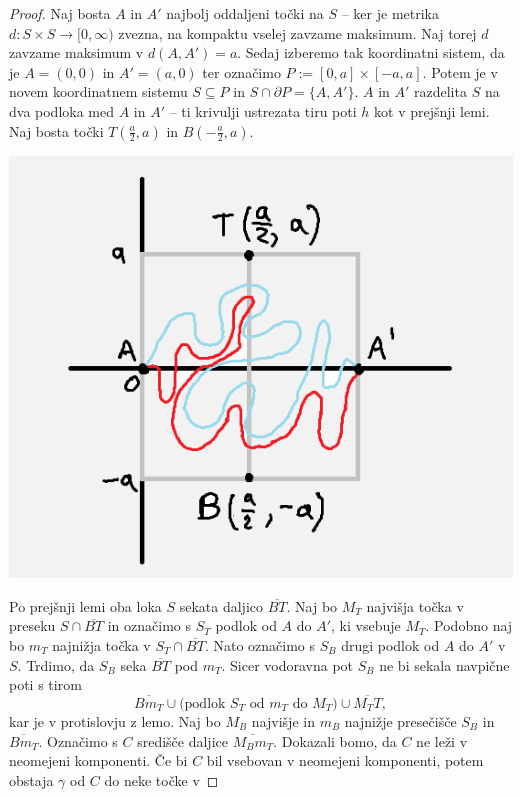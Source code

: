 \documentclass[10pt, a4paper]{article}
\newenvironment{noticeC}{%
  \tcolorbox[%
  notitle,
  empty,
  enhanced,  %
  breakable,
  coltext=black, 
  fontupper=\rmfamily,
  noparskip,
  sharp corners,
  boxrule=-1pt,  %
  frame hidden,
  left=7pt,  %
  right=7pt,
  top=5pt,
  bottom=5pt,
  before skip=2.5ex plus 2pt,
  after skip=2.5ex plus 2pt,
  overlay unbroken and last={%
  },
  ]}
{\endtcolorbox}
\newenvironment{dokaz}%
  {\begin{noticeC}\begin{proof}}%
  {\end{proof}\end{noticeC}}
\begin{document}
\begin{dokaz}
  Naj bosta $A$ in $A'$ najbolj oddaljeni točki na $S$ -- ker je metrika $d: S \times S \to [0, \infty)$
  zvezna, na kompaktu vselej zavzame maksimum. Naj torej $d$ zavzame maksimum v $d(A, A') = a$.
  Sedaj izberemo tak koordinatni sistem, da je $A = (0, 0)$ in $A' = (a, 0)$ ter označimo $P := [0, a] \times [-a, a]$.
  Potem je v novem koordinatnem sistemu $S \subseteq P$ in $S \cap \partial P = \{A, A'\}$.
  $A$ in $A'$ razdelita $S$ na dva podloka med $A$ in $A'$ -- ti krivulji ustrezata tiru poti $h$ kot v prejšnji lemi.
  Naj bosta točki $T\left(\frac{a}{2}, a\right)$ in $B\left(-\frac{a}{2}, a\right)$.
  \begin{center}
    \includegraphics[scale=0.8]{dokaz5.png}
  \end{center}
  Po prejšnji lemi oba loka $S$ sekata daljico $\overline{BT}$.
  Naj bo $M_T$ najvišja točka v preseku $S \cap \overline{BT}$ in označimo s $S_T$ podlok od $A$ do $A'$,
  ki vsebuje $M_T$. Podobno naj bo $m_T$ najnižja točka v $S_T \cap \overline{BT}$. Nato označimo 
  s $S_B$ drugi podlok od $A$ do $A'$ v $S$. Trdimo, da $S_B$ seka $\overline{BT}$ pod $m_T$.
  Sicer vodoravna pot $S_B$ ne bi sekala navpične poti s tirom 
  $$\overline{Bm_T} \cup \text{(podlok $S_T$ od $m_T$ do $M_T$)} \cup \overline{M_T T},$$
  kar je v protislovju z lemo. Naj bo $M_B$ najvišje in $m_B$ najnižje presečišče $S_B$ in $\overline{B m_T}$.
  Označimo s $C$ središče daljice $\overline{M_B m_T}$. Dokazali bomo, da $C$ ne leži v neomejeni komponenti.
  Če bi $C$ bil vsebovan v neomejeni komponenti, potem obstaja $\gamma$ od $C$ do neke točke v 

\end{dokaz}
\end{document}
